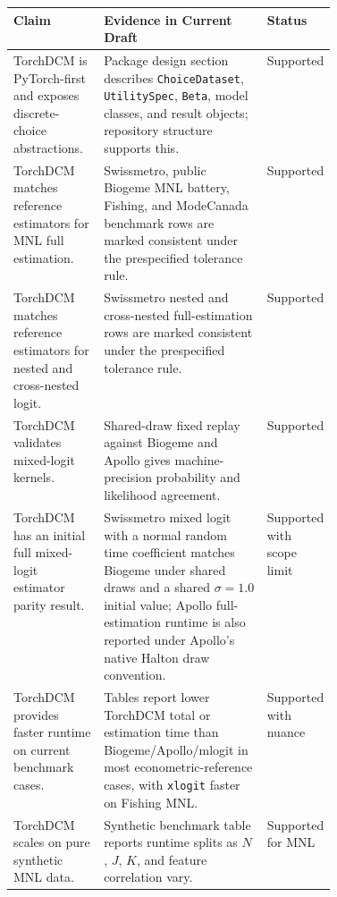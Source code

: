 \small
\begin{tabularx}{\linewidth}{>{\raggedright\arraybackslash}p{0.28\linewidth}X>{\raggedright\arraybackslash}p{0.14\linewidth}}
\toprule
Claim & Evidence in Current Draft & Status \\
\midrule
TorchDCM is PyTorch-first and exposes discrete-choice abstractions. & Package design section describes \texttt{ChoiceDataset}, \texttt{UtilitySpec}, \texttt{Beta}, model classes, and result objects; repository structure supports this. & Supported \\
TorchDCM matches reference estimators for MNL full estimation. & Swissmetro, public Biogeme MNL battery, Fishing, and ModeCanada benchmark rows are marked consistent under the prespecified tolerance rule. & Supported \\
TorchDCM matches reference estimators for nested and cross-nested logit. & Swissmetro nested and cross-nested full-estimation rows are marked consistent under the prespecified tolerance rule. & Supported \\
TorchDCM validates mixed-logit kernels. & Shared-draw fixed replay against Biogeme and Apollo gives machine-precision probability and likelihood agreement. & Supported \\
TorchDCM has an initial full mixed-logit estimator parity result. & Swissmetro mixed logit with a normal random time coefficient matches Biogeme under shared draws and a shared $\sigma=1.0$ initial value; Apollo full-estimation runtime is also reported under Apollo's native Halton draw convention. & Supported with scope limit \\
TorchDCM provides faster runtime on current benchmark cases. & Tables report lower TorchDCM total or estimation time than Biogeme/Apollo/mlogit in most econometric-reference cases, with \texttt{xlogit} faster on Fishing MNL. & Supported with nuance \\
TorchDCM scales on pure synthetic MNL data. & Synthetic benchmark table reports runtime splits as $N$, $J$, $K$, and feature correlation vary. & Supported for MNL \\
\bottomrule
\end{tabularx}
